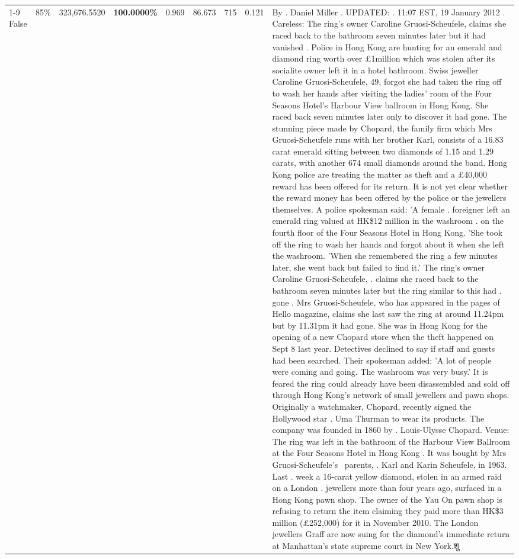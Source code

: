 \begin{table}[H]
\begin{tabular}{lllrlllll}
\cline{1-9} \cline{2-9}
False & 85\% & 323,676.5520 & \bfseries \color{red} 100.0000\% & 0.969 & 86.673 & 715 & 0.121 & By . Daniel Miller . UPDATED: . 11:07 EST, 19 January 2012 . Careless: The ring's owner Caroline Gruosi-Scheufele, claims she raced back to the bathroom seven minutes later but it had vanished . Police in Hong Kong are hunting for an emerald and diamond ring worth over £1million which was stolen after its socialite owner left it in a hotel bathroom. Swiss jeweller Caroline Gruosi-Scheufele, 49, forgot she had taken the ring off to wash her hands after visiting the ladies' room of the Four Seasons Hotel's Harbour View ballroom in Hong Kong. She raced back seven minutes later only to discover it had gone. The stunning piece made by Chopard, the family firm which Mrs Gruosi-Scheufele runs with her brother Karl, consists of a 16.83 carat emerald sitting between two diamonds of 1.15 and 1.29 carats, with another 674 small diamonds around the band. Hong Kong police are treating the matter as theft and a £40,000 reward has been offered for its return. It is not yet clear whether the reward money has been offered by the police or the jewellers themselves. A police spokesman said: 'A female . foreigner left an emerald ring valued at HK\$12 million in the washroom . on the fourth floor of the Four Seasons Hotel in Hong Kong. 'She took off the ring to wash her hands and forgot about it when she left the washroom. 'When she remembered the ring a few minutes later, she went back but failed to find it.' The ring's owner Caroline Gruosi-Scheufele, . claims she raced back to the bathroom seven minutes later but the ring similar to this had . gone . Mrs Gruosi-Scheufele, who has appeared in the pages of Hello magazine, claims she last saw the ring at around 11.24pm but by 11.31pm it had gone. She was in Hong Kong for the opening of a new Chopard store when the theft happened on Sept 8 last year. Detectives declined to say if staff and guests had been searched. Their spokesman added: 'A lot of people were coming and going. The washroom was very busy.' It is feared the ring could already have been disassembled and sold off through Hong Kong's network of small jewellers and pawn shops. Originally a watchmaker, Chopard, recently signed the Hollywood star . Uma Thurman to wear its products. The company was founded in 1860 by . Louis-Ulysse Chopard. Venue: The ring was left in the bathroom of the Harbour View Ballroom at the Four Seasons Hotel in Hong Kong . It was bought by Mrs Gruosi-Scheufele's  parents, . Karl and Karin Scheufele, in 1963. Last . week a 16-carat yellow diamond, stolen in an armed raid on a London . jewellers more than four years ago, surfaced in a Hong Kong pawn shop. The owner of the Yau On pawn shop is refusing to return the item claiming they paid more than HK\$3 million (£252,000) for it in November 2010. The London jewellers Graff are now suing for the diamond’s immediate return at Manhattan’s state supreme court in New York.शु \\

\end{tabular}
\end{table}
